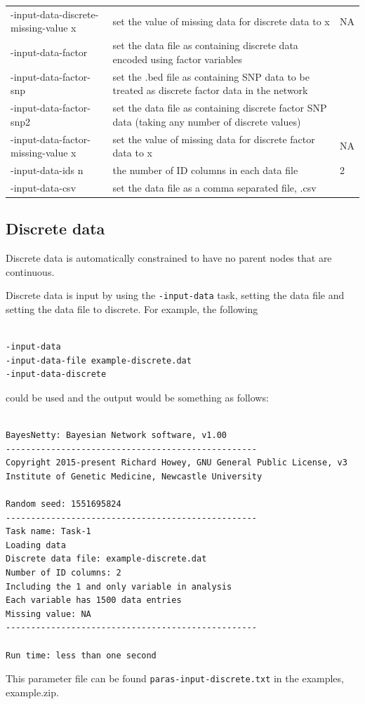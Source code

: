 \documentclass[a4paper,12pt]{article}
\newcommand{\code}[1]{{\footnotesize{{\tt #1}}}}
\begin{document}
{\begin{center}
{\begin{tabular}{lp{9cm}l}
-input-data-discrete-missing-value x  & set the value of missing data for discrete data to x  & NA\\
-input-data-factor  & set the data file as containing discrete data encoded using factor variables  & \\
-input-data-factor-snp  & set the .bed file as containing SNP data to be treated as discrete factor data in the network  & \\
-input-data-factor-snp2  & set the data file as containing discrete factor SNP data (taking any number of discrete values)  & \\
-input-data-factor-missing-value x  & set the value of missing data for discrete factor data to x  & NA\\
-input-data-ids n  & the number of ID columns in each data file  & 2\\
-input-data-csv  & set the data file as a comma separated file, .csv  & \\
\end{tabular}}\end{center}}


\subsection{Discrete data}
\label{input-data-discrete}

Discrete data is automatically constrained to have no parent nodes that are continuous. 

Discrete data is input by using the \code{-input-data} task, setting the data file and setting the data file to discrete. For example, the following 
\vspace{0.35cm} \begin{lstlisting}

-input-data
-input-data-file example-discrete.dat
-input-data-discrete

\end{lstlisting} \vspace{0.35cm}
could be used and the output would be something as follows: 
\vspace{0.35cm} \begin{lstlisting}

BayesNetty: Bayesian Network software, v1.00
--------------------------------------------------
Copyright 2015-present Richard Howey, GNU General Public License, v3
Institute of Genetic Medicine, Newcastle University

Random seed: 1551695824
--------------------------------------------------
Task name: Task-1
Loading data
Discrete data file: example-discrete.dat
Number of ID columns: 2
Including the 1 and only variable in analysis
Each variable has 1500 data entries
Missing value: NA
--------------------------------------------------

Run time: less than one second

\end{lstlisting} \vspace{0.35cm}
This parameter file can be found \code{paras-input-discrete.txt} in the examples, example.zip. 
\end{document}
